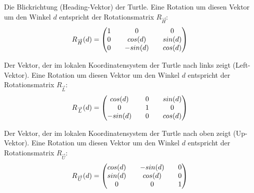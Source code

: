 \begin{description}[labelindent]
		\item[\boldmath$\overrightarrow{H}$]Die Blickrichtung (Heading-Vektor) der Turtle. Eine Rotation um diesen Vektor um den Winkel $d$ entspricht der Rotationsmatrix $R_{\overrightarrow{H}}$:\\
		\begin{equation}
		R_{\overrightarrow{H}}(d) = 
		\setlength\arraycolsep{10pt}
		\begin{pmatrix}
		1	 	& 0			& 0 \\
		0		& cos(d)	& sin(d) \\
		0 		& -sin(d)	& cos(d)
		\end{pmatrix}	
		\label{eq:rotH}
		\end{equation} 
		
		\item[\boldmath$\overrightarrow{L}$] Der Vektor, der im lokalen Koordinatensystem der Turtle nach links zeigt (Left-Vektor). Eine Rotation um diesen Vektor um den Winkel $d$ entspricht der Rotationsmatrix $R_{\overrightarrow{L}}$:\\
		\begin{equation}
		R_{\overrightarrow{L}}(d) = 
		\setlength\arraycolsep{10pt}
		\begin{pmatrix}
		cos(d) 	& 0		 	& sin(d) \\
		0		& 1			& 0 \\
		-sin(d)	& 0 		&  cos(d)
		\end{pmatrix}	
		\label{eq:rotL}
		\end{equation} 
		
		\item[\boldmath$\overrightarrow{U}$]Der Vektor, der im lokalen Koordinatensystem der Turtle nach oben zeigt (Up-Vektor). Eine Rotation um diesen Vektor um den Winkel $d$ entspricht der Rotationsmatrix $R_{\overrightarrow{U}}$:\\
		\begin{equation}
		R_{\overrightarrow{U}}(d) = 
		\setlength\arraycolsep{10pt}
		\begin{pmatrix}
		cos(d) 	& -sin(d) 	& 0 \\
		sin(d)	& cos(d) 	& 0 \\
		0 		& 0 		& 1
		\end{pmatrix}	
		\label{eq:rotU}
		\end{equation} 
		
	
\end{description}
\cite[S.19]{ABOP:04} \cite[S.69]{Deussen:05} \\

